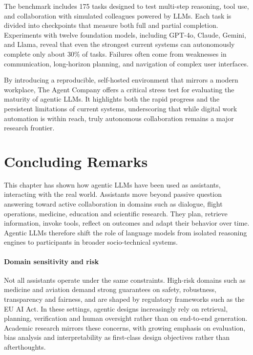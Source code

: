 The benchmark includes 175 tasks designed to test multi-step reasoning, tool use, and collaboration with simulated colleagues powered by LLMs. Each task is divided into checkpoints that measure both full and partial completion. Experiments with twelve foundation models, including GPT-4o, Claude, Gemini, and Llama, reveal that even the strongest current systems can autonomously complete only about 30\% of tasks. Failures often come from weaknesses in communication, long-horizon planning, and navigation of complex user interfaces.

By introducing a reproducible, self-hosted environment that mirrors a modern workplace, The Agent Company offers a critical stress test for evaluating the maturity of agentic LLMs. It highlights both the rapid progress and the persistent limitations of current systems, underscoring that while digital work automation is within reach, truly autonomous collaboration remains a major research frontier.


\section{Concluding Remarks}

This chapter has shown how agentic LLMs have been used as assistants, interacting with the real world. Assistants move beyond passive question answering toward active collaboration in domains such as dialogue, flight operations, medicine, education and scientific research. They plan, retrieve information, invoke tools, reflect on outcomes and adapt their behavior over time. Agentic LLMs therefore shift the role of language models from isolated reasoning engines to participants in broader socio-technical systems.

\paragraph{Domain sensitivity and risk}
Not all assistants operate under the same constraints. High-risk domains such as medicine and aviation demand strong guarantees on safety, robustness, transparency and fairness, and are shaped by regulatory frameworks such as the EU AI Act. In these settings, agentic designs increasingly rely on retrieval, planning, verification and human oversight rather than on end-to-end generation. Academic research mirrors these concerns, with growing emphasis on evaluation, bias analysis and interpretability as first-class design objectives rather than afterthoughts.

